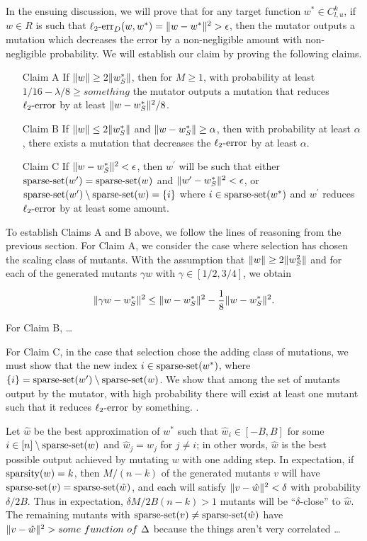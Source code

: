 In the ensuing discussion, we will prove that for any target function
$w^* \in C^k_{l,u}$, if $w \in R$ is such that
$\mathrm{\ell_2\mbox{-}err}_D(w, w^*) = \Vert w - w^* \Vert^2 > \epsilon$,
then the mutator outputs a mutation which decreases the error by a
non-negligible amount with non-negligible probability.
We will establish our claim by proving the following claims.

\begin{enumerate}
\item[Claim A] If $\Vert w \Vert \ge 2 \Vert w^*_S \Vert$, then for $M \ge 1$,
with probability at least $1/16 - \lambda/8 \ge something$ the mutator outputs
a mutation that reduces $\mathrm{\ell_2\mbox{-}error}$ by at least $\Vert w - w^*_S \Vert^2 / 8$.
\item[Claim B] If $\Vert w \Vert \le 2 \Vert w^*_S \Vert$ and
$\Vert w - w^*_S \Vert \ge \alpha$, then with probability at least $\alpha$,
there exists a mutation that decreases the $\mathrm{\ell_2\mbox{-}error}$ by at least $\alpha$.
\item[Claim C] If $\Vert w - w^*_S \Vert^2 < \epsilon$, then $w^\prime$ will be
such that either $\mathrm{sparse\mbox{-}set}(w^\prime) = \mathrm{sparse\mbox{-}set}(w)$ and
$\Vert w^\prime - w^*_S \Vert^2 < \epsilon$, or
$\mathrm{sparse\mbox{-}set}(w^\prime) \setminus \mathrm{sparse\mbox{-}set}(w) = \{i\}$ where $i \in \mathrm{sparse\mbox{-}set}(w^*)$
and $w^\prime$ reduces $\mathrm{\ell_2\mbox{-}error}$ by at least some amount.
\end{enumerate}

To establish Claims A and B above, we follow the lines of reasoning from the
previous section.
For Claim A, we consider the case where selection has chosen the scaling class
of mutants.  With the assumption that $\Vert w \Vert \ge 2 \Vert w_S^2 \Vert$ and
for each of the generated mutants $\gamma w$ with $\gamma \in [1/2, 3/4]$,
we obtain

\[
\Vert \gamma w - w^*_S \Vert^2 \le \Vert w - w^*_S \Vert^2 - \frac{1}{8}\Vert w - w^*_S \Vert^2.
\]

For Claim B, \dots

For Claim C, in the case that selection chose the adding class of mutations,
we must show that the new index $i \in \mathrm{sparse\mbox{-}set}(w^*)$, where
$\{i\} = \mathrm{sparse\mbox{-}set}(w^\prime) \setminus \mathrm{sparse\mbox{-}set}(w)$.
We show that among the set of mutants output by the mutator, with high probability
there will exist at least one mutant such that it reduces $\mathrm{\ell_2\mbox{-}error}$ by something.
.

Let $\hat{w}$ be the best approximation of $w^*$ such that $\hat{w}_i \in [-B, B]$
for some $i \in [n] \setminus \mathrm{sparse\mbox{-}set}(w)$ and $\hat{w}_j = w_j$ for $j \neq i$;
in other words, $\hat{w}$ is the best possible output achieved by mutating $w$ with
one adding step.
In expectation, if $\mathrm{sparsity}(w) = k$, then $M / (n - k)$ of the generated mutants
$v$ will have $\mathrm{sparse\mbox{-}set}(v) = \mathrm{sparse\mbox{-}set}(\hat{w})$, and each will satisfy
$\Vert v - \hat{w} \Vert^2 < \delta$ with probability $\delta/2B$.
Thus in expectation, $\delta M / 2B(n - k) > 1$ mutants will be
``$\delta$-close'' to $\hat{w}$.
The remaining mutants with $\mathrm{sparse\mbox{-}set}(v) \neq \mathrm{sparse\mbox{-}set}(\hat{w})$ have
$\Vert v - \hat{w} \Vert^2 > some~function~of~\Delta$
because the things aren't very correlated \dots

